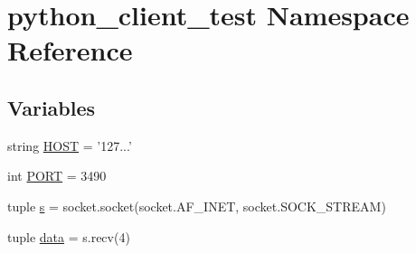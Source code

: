 \hypertarget{namespacepython__client__test}{\section{python\-\_\-client\-\_\-test Namespace Reference}
\label{namespacepython__client__test}
}
\subsection*{Variables}
\begin{DoxyCompactItemize}
\item 
string \hyperlink{namespacepython__client__test_a92606c7a15210740590acd070e01df55}{H\-O\-S\-T} = '127...'
\item 
int \hyperlink{namespacepython__client__test_ad1345f8ee5062de9e8a7ed7efdf18ac7}{P\-O\-R\-T} = 3490
\item 
tuple \hyperlink{namespacepython__client__test_afe25ba75e651f13976e71c474188ef96}{s} = socket.\-socket(socket.\-A\-F\-\_\-\-I\-N\-E\-T, socket.\-S\-O\-C\-K\-\_\-\-S\-T\-R\-E\-A\-M)
\item 
tuple \hyperlink{namespacepython__client__test_a70aa6f62f16d17a2bdf23844fb86b039}{data} = s.\-recv(4)
\end{DoxyCompactItemize}


